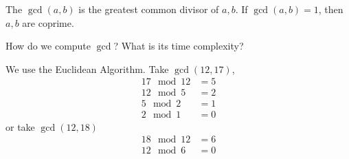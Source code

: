\begin{definition}
    The $\gcd(a, b)$ is the greatest common divisor of $a, b$. If $\gcd(a, b) = 1$, then $a, b$ are coprime.
\end{definition}
\begin{ques*}
    How do we compute $\gcd$? What is its time complexity?
\end{ques*}
\begin{example*}
    We use the Euclidean Algorithm. Take $\gcd(12, 17)$,
    \begin{align*}
        17\mod{12} & = 5 \\
        12 \mod{5} & = 2 \\
        5\mod{2}   & = 1 \\
        2\mod{1}   & = 0
    \end{align*}
    or take $\gcd(12, 18)$
    \begin{align*}
        18\mod{12} & = 6 \\
        12\mod{6}  & = 0
    \end{align*}
\end{example*}



